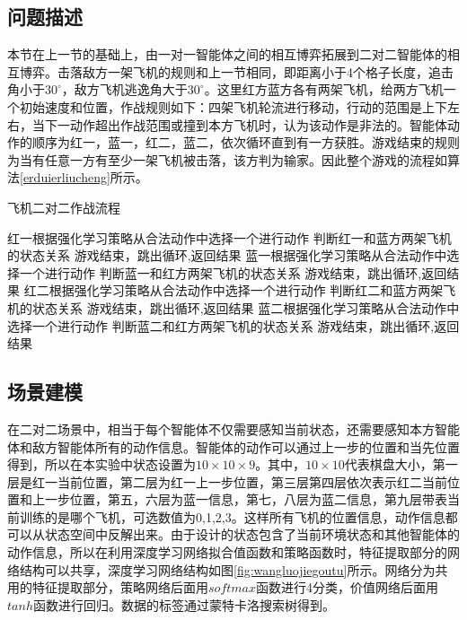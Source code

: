\subsection{问题描述}
本节在上一节的基础上，由一对一智能体之间的相互博弈拓展到二对二智能体的相互博弈。击落敌方一架飞机的规则和上一节相同，即距离小于4个格子长度，追击角小于$30^\circ$，敌方飞机逃逸角大于$30^\circ$。这里红方蓝方各有两架飞机，给两方飞机一个初始速度和位置，作战规则如下：四架飞机轮流进行移动，行动的范围是上下左右，当下一动作超出作战范围或撞到本方飞机时，认为该动作是非法的。智能体动作的顺序为红一，蓝一，红二，蓝二，依次循环直到有一方获胜。游戏结束的规则为当有任意一方有至少一架飞机被击落，该方判为输家。因此整个游戏的流程如算法\ref{erduierliucheng}所示。
\begin{algorithm}[htbp]
	\caption{飞机二对二作战流程}%
	\label{erduierliucheng}
	\begin{algorithmic}[1]%
		\State 红一根据强化学习策略从合法动作中选择一个进行动作
		\State 判断红一和蓝方两架飞机的状态关系
		\State 游戏结束，跳出循环,返回结果
		\EndIf
		\State 蓝一根据强化学习策略从合法动作中选择一个进行动作
		\State 判断蓝一和红方两架飞机的状态关系
		\State 游戏结束，跳出循环,返回结果
		\EndIf
		\State 红二根据强化学习策略从合法动作中选择一个进行动作
		\State 判断红二和蓝方两架飞机的状态关系
		\State 游戏结束，跳出循环,返回结果
		\EndIf
		\State 蓝二根据强化学习策略从合法动作中选择一个进行动作
		\State 判断蓝二和红方两架飞机的状态关系
		\State 游戏结束，跳出循环,返回结果
		\EndIf
		\EndFor
	\end{algorithmic}
\end{algorithm}

\subsection{场景建模}

在二对二场景中，相当于每个智能体不仅需要感知当前状态，还需要感知本方智能体和敌方智能体所有的动作信息。智能体的动作可以通过上一步的位置和当先位置得到，所以在本实验中状态设置为$10 \times 10 \times 9$。其中，$10 \times 10$代表棋盘大小，第一层是红一当前位置，第二层为红一上一步位置，第三层第四层依次表示红二当前位置和上一步位置，第五，六层为蓝一信息，第七，八层为蓝二信息，第九层带表当前训练的是哪个飞机，可选数值为0,1,2,3。这样所有飞机的位置信息，动作信息都可以从状态空间中反解出来。由于设计的状态包含了当前环境状态和其他智能体的动作信息，所以在利用深度学习网络拟合值函数和策略函数时，特征提取部分的网络结构可以共享，深度学习网络结构如图\ref{fig:wangluojiegoutu}所示。网络分为共用的特征提取部分，策略网络后面用$softmax$函数进行4分类，价值网络后面用$tanh$函数进行回归。数据的标签通过蒙特卡洛搜索树得到。

